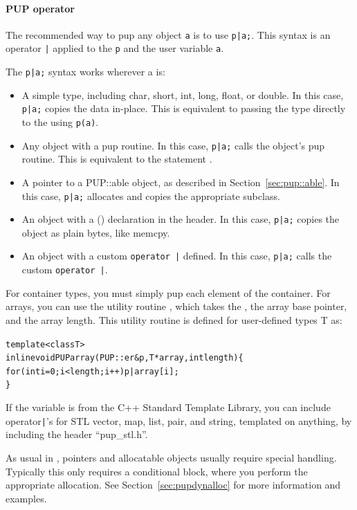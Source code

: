 \paragraph{PUP operator}
\label{sec:pupstl}

The recommended way to pup any object \verb.a. is to use \verb.p|a;..
This syntax is an operator \verb.|. applied to the  \verb.p.
and the user variable \verb.a..

The \verb.p|a;. syntax works wherever a is:

\begin{itemize}
 \item A simple type, including char, short, int, long, float, or double.
    In this case, \verb.p|a;. copies the data in-place.
    This is equivalent to passing the type directly to the    
       using \verb.p(a)..
 \item Any object with a pup routine.
    In this case, \verb.p|a;. calls the object's pup routine.
    This is equivalent to the statement . 
 \item A pointer to a PUP::able object, as described in Section~\ref{sec:pup::able}.
    In this case, \verb.p|a;. allocates and copies the appropriate subclass.
 \item An object with a () declaration in the header.
    In this case, \verb.p|a;. copies the object as plain bytes, like memcpy.
 \item An object with a custom \verb.operator |. defined.
    In this case, \verb.p|a;. calls the custom \verb.operator |..
\end{itemize}

For container types, you must simply pup each element of the container.
For arrays, you can use the utility routine , which takes
the , the array base pointer, and the array length.
This utility routine is defined for user-defined types T as:
  \begin{alltt}
    template<class T>
    inline void PUParray(PUP::er &p,T *array,int length) \{
       for (int i=0;i<length;i++) p|array[i];
    \}
  \end{alltt}

If the variable is from the C++ Standard Template Library, you can include 
operator\verb.|.'s for STL vector, map, list, pair, and string, templated
on anything, by including the header ``pup\_stl.h''.

As usual in \CC{}, pointers and allocatable objects usually require special handling. 
Typically this only requires a  conditional block, 
where you perform the appropriate allocation.  See 
Section~\ref{sec:pupdynalloc} for more information and examples.  

